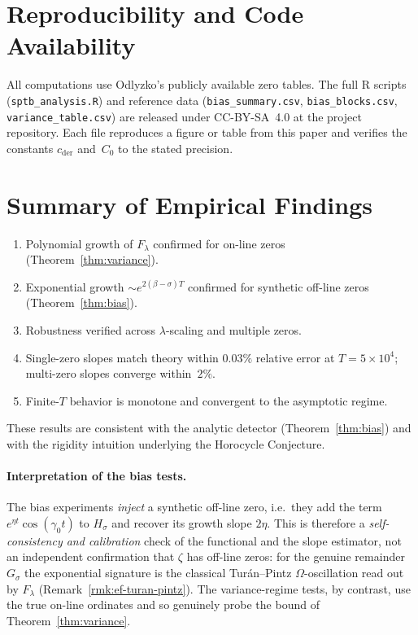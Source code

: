 \section{Reproducibility and Code Availability}

All computations use Odlyzko’s publicly available zero tables.
The full R scripts (\texttt{sptb\_analysis.R}) and reference data
(\texttt{bias\_summary.csv}, \texttt{bias\_blocks.csv},
\texttt{variance\_table.csv}) are released under
CC-BY-SA~4.0 at the project repository.
Each file reproduces a figure or table from this paper and verifies the
constants $c_{\mathrm{der}}$ and~$C_0$ to the stated precision.

\section{Summary of Empirical Findings}

\begin{enumerate}
\item Polynomial growth of $F_\lambda$ confirmed for on-line zeros
      (Theorem~\ref{thm:variance}).  
\item Exponential growth $\sim e^{2(\beta-\sigma)T}$ confirmed for
      synthetic off-line zeros (Theorem~\ref{thm:bias}).  
\item Robustness verified across $\lambda$-scaling and multiple zeros.  
\item Single-zero slopes match theory within $0.03\%$ relative error
      at $T=5\times10^4$; multi-zero slopes converge within~$2\%$.
\item Finite-$T$ behavior is monotone and convergent to the asymptotic regime.
\end{enumerate}

These results are consistent with the analytic detector
(Theorem~\ref{thm:bias}) and with the rigidity intuition
underlying the Horocycle Conjecture.

\paragraph{Interpretation of the bias tests.}
The bias experiments \emph{inject} a synthetic off-line zero, i.e.\ they add
the term $e^{\eta t}\cos(\gamma_0 t)$ to $H_\sigma$ and recover its growth slope
$2\eta$.  This is therefore a \emph{self-consistency and calibration} check of
the functional and the slope estimator, not an independent confirmation that
$\zeta$ has off-line zeros: for the genuine remainder $G_\sigma$ the exponential
signature is the classical Tur\'an--Pintz $\Omega$-oscillation read out by
$F_\lambda$ (Remark~\ref{rmk:ef-turan-pintz}).  The variance-regime tests, by
contrast, use the true on-line ordinates and so genuinely probe the bound of
Theorem~\ref{thm:variance}.
